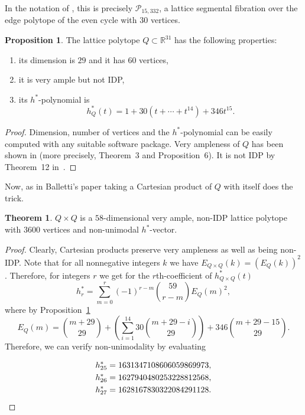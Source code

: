 \documentclass[11pt]{amsart}
\theoremstyle{definition}
\newtheorem{prop}[defn]{Proposition}
\newtheorem{thm}[defn]{Theorem}
\newcommand{\R}{\mathbb{R}}
\newcommand{\hs}{h^*}
\begin{document}
In the notation of \cite{Mat}, this is precisely $\mathcal{P}_{15,332}$, a lattice segmental fibration over the edge polytope of the even cycle with $30$ vertices.
\begin{prop}\label{prop}
    The lattice polytope $Q \subset \R^{31}$ has the following properties:
    \begin{enumerate}
        \item its dimension is $29$ and it has $60$ vertices,
        \item it is very ample but not IDP,
        \item its $h^*$-polynomial is
            \[
                h_Q^*(t)=1+30(t+\cdots+t^{14})+346t^{15}.
            \]
    \end{enumerate}
\end{prop}

\begin{proof}
    Dimension, number of vertices and the $h^*$-polynomial can be easily computed with any suitable software package.
    Very ampleness of $Q$ has been shown in \cite{Mat} (more precisely, Theorem~3 and Proposition~6).
    It is not IDP by Theorem~12 in~\cite{Mat}.
\end{proof}

Now, as in Balletti's paper \cite{Balletti} taking a Cartesian product of $Q$ with itself does the trick.

\begin{thm} \label{thm:main}
    $Q \times Q$ is a $58$-dimensional very ample, non-IDP lattice polytope with $3600$ vertices and non-unimodal $h^*$-vector.
\end{thm}

\begin{proof}
    Clearly, Cartesian products preserve very ampleness as well as being non-IDP. Note that for all nonnegative integers $k$ we have $E_{Q \times Q}(k)=(E_Q(k))^2$. Therefore, for integers $r$ we get for the $r$th-coefficient of $h^*_{Q \times Q}(t)$
    \[h_r^*=\sum_{m=0}^r (-1)^{r-m} \binom{59}{r-m} E_Q(m)^2,\]
    where by Proposition~\ref{prop}
    \[E_Q(m)=\binom{m+29}{29}+\left(\sum_{i=1}^{14} 30 \binom{m+29-i}{29}\right) + 346 \binom{m+29-15}{29}.\] 
    Therefore, we can verify non-unimodality by evaluating
    
    \begin{align*}
        \hs_{25} &= 1631347108606059869973,\\
        \hs_{26} &= 1627940480253228812568,\\
        \hs_{27} &= 1628167830322084291128. \qedhere
    \end{align*}
\end{proof}
\end{document}
